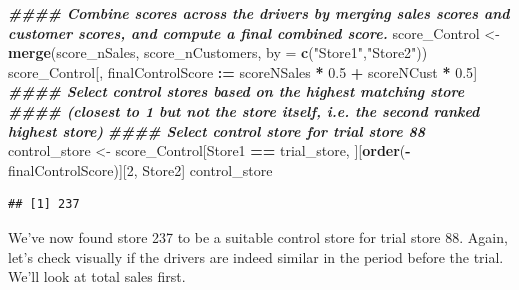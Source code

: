 \documentclass[
]{article}
\newenvironment{Shaded}{\begin{snugshade}}{\end{snugshade}}
\newcommand{\AttributeTok}[1]{\textcolor[rgb]{0.13,0.29,0.53}{#1}}
\newcommand{\DecValTok}[1]{\textcolor[rgb]{0.00,0.00,0.81}{#1}}
\newcommand{\DocumentationTok}[1]{\textcolor[rgb]{0.56,0.35,0.01}{\textbf{\textit{#1}}}}
\newcommand{\FloatTok}[1]{\textcolor[rgb]{0.00,0.00,0.81}{#1}}
\newcommand{\FunctionTok}[1]{\textcolor[rgb]{0.13,0.29,0.53}{\textbf{#1}}}
\newcommand{\NormalTok}[1]{#1}
\newcommand{\OtherTok}[1]{\textcolor[rgb]{0.56,0.35,0.01}{#1}}
\newcommand{\SpecialCharTok}[1]{\textcolor[rgb]{0.81,0.36,0.00}{\textbf{#1}}}
\newcommand{\StringTok}[1]{\textcolor[rgb]{0.31,0.60,0.02}{#1}}
\begin{document}
\begin{Shaded}
\begin{Highlighting}[]
\DocumentationTok{\#\#\#\# Combine scores across the drivers by merging sales scores and customer scores, and compute a final combined score.}
\NormalTok{score\_Control }\OtherTok{\textless{}{-}} \FunctionTok{merge}\NormalTok{(score\_nSales, score\_nCustomers, }\AttributeTok{by =} \FunctionTok{c}\NormalTok{(}\StringTok{"Store1"}\NormalTok{,}\StringTok{"Store2"}\NormalTok{))}
\NormalTok{score\_Control[, finalControlScore }\SpecialCharTok{:=}\NormalTok{ scoreNSales }\SpecialCharTok{*} \FloatTok{0.5} \SpecialCharTok{+}\NormalTok{ scoreNCust }\SpecialCharTok{*} \FloatTok{0.5}\NormalTok{]}
\DocumentationTok{\#\#\#\# Select control stores based on the highest matching store}
\DocumentationTok{\#\#\#\# (closest to 1 but not the store itself, i.e. the second ranked highest store)}
\DocumentationTok{\#\#\#\# Select control store for trial store 88}
\NormalTok{control\_store }\OtherTok{\textless{}{-}}\NormalTok{ score\_Control[Store1 }\SpecialCharTok{==}\NormalTok{ trial\_store, ][}\FunctionTok{order}\NormalTok{(}\SpecialCharTok{{-}}\NormalTok{finalControlScore)][}\DecValTok{2}\NormalTok{, Store2]}
\NormalTok{control\_store}
\end{Highlighting}
\end{Shaded}

\begin{verbatim}
## [1] 237
\end{verbatim}

We've now found store 237 to be a suitable control store for trial store
88. Again, let's check visually if the drivers are indeed similar in the
period before the trial. We'll look at total sales first.
\end{document}

